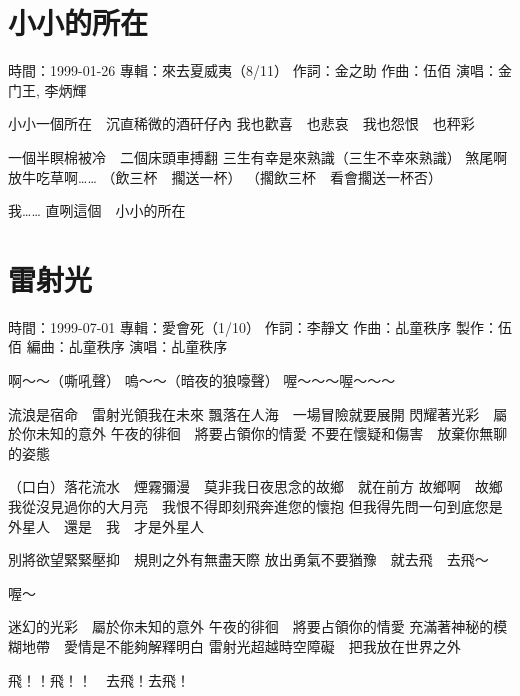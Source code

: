 \documentclass[UTF8,a4paper,oneside,twocolumn,12pt]{ctexbook}
\newcommand{\infopair}[2]{\textbullet #1：#2}
\newcommand{\zc}[1][伍佰]{\infopair{作詞}{#1}}
\newcommand{\zq}[1][伍佰]{\infopair{作曲}{#1}}
\newcommand{\bq}[1][伍佰]{\infopair{編曲}{#1}}
\newcommand{\zj}[1]{\infopair{專輯}{#1}}
\newcommand{\zz}[1]{\infopair{製作}{#1}}
\newcommand{\sj}[1]{\infopair{時間}{#1}}
\newenvironment{info}{\begin{flushleft}\kaishu
	}
	{\end{flushleft}\normalsize\yahei\par}
\newenvironment{lyric}{
	}
{}
\begin{document}
\section{小小的所在}
\begin{info}
	\sj{1999-01-26}
	\zj{來去夏威夷（8/11）}
	\zc[金之助]
	\zq[伍佰]
	\infopair{演唱}{金门王, 李炳輝}
\end{info}
\begin{lyric}
	小小一個所在　沉直稀微的酒矸仔內
	我也歡喜　也悲哀　我也怨恨　也秤彩

	一個半瞑棉被冷　二個床頭車搏翻
	三生有幸是來熟識（三生不幸來熟識）
	煞尾啊放牛吃草啊……
	（飲三杯　擱送一杯）
	（擱飲三杯　看會擱送一杯否）

	我…… 直咧這個　小小的所在
\end{lyric}

\section{雷射光}
\begin{info}
	\sj{1999-07-01}
	\zj{愛會死（1/10）}
	\zc[李靜文]
	\zq[乩童秩序]
	\zz{伍佰}
	\bq[乩童秩序]
	\infopair{演唱}{乩童秩序}
\end{info}
\begin{lyric}
	啊～～（嘶吼聲）
	嗚～～（暗夜的狼嚎聲）
	喔～～～喔～～～

	流浪是宿命　雷射光領我在未來
	飄落在人海　一場冒險就要展開
	閃耀著光彩　屬於你未知的意外
	午夜的徘徊　將要占領你的情愛
	不要在懷疑和傷害　放棄你無聊的姿態

	（口白）落花流水　煙霧彌漫　莫非我日夜思念的故鄉　就在前方
	故鄉啊　故鄉　我從沒見過你的大月亮　我恨不得即刻飛奔進您的懷抱
	但我得先問一句到底您是外星人　還是　我　才是外星人

	別將欲望緊緊壓抑　規則之外有無盡天際
	放出勇氣不要猶豫　就去飛　去飛～

	喔～

	迷幻的光彩　屬於你未知的意外
	午夜的徘徊　將要占領你的情愛
	充滿著神秘的模糊地帶　愛情是不能夠解釋明白
	雷射光超越時空障礙　把我放在世界之外

	飛！！飛！！　去飛！去飛！
\end{lyric}
\end{document}
